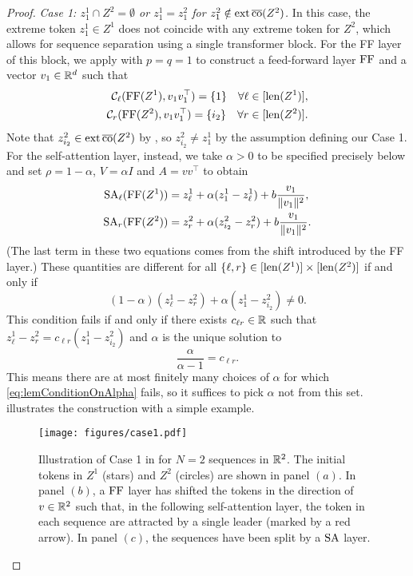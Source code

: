 \documentclass[11pt,a4paper]{amsart}
\begin{document}
\begin{proof}
\textit{Case 1: $z_1^1 \cap Z^2 = \emptyset$ or $z_1^1 = z_1^2$ for $z_1^2 \notin \operatorname{ext}\operatorname{\overline{co}} (Z^2)$.} In this case, the extreme token $z_1^1 \in Z^1$ does not coincide with any extreme token for $Z^2$, which allows for sequence separation using a single transformer block. For the FF layer of this block, we apply  with $p = q = 1$ to construct a feed-forward layer $\operatorname{\mathrm{FF}}$ and a vector $v_1\in \mathbb{R}^d$ such that
\begin{subequations}
    \begin{align}
    \mathcal{C}_{\ell} (\operatorname{\mathrm{FF}} (Z^1), v_1 v_1^\top) = \{ 1 \} \quad \forall \ell \in [\operatorname{len} (Z^1)],
    \\ 
    \mathcal{C}_r (\operatorname{\mathrm{FF}} (Z^2), v_1 v_1^\top) = \{ i_2 \} \quad \forall r \in [\operatorname{len} (Z^2)].
\end{align}
\end{subequations}
Note that $z_{i_2}^2\in \operatorname{ext} \operatorname{\overline{co}} (Z^2)$ by  , so $z_{i_2}^2\neq z_1^1$ by the assumption defining our Case 1. For the self-attention layer, instead, we take $\alpha > 0$ to be specified precisely below and set $\rho = 1 -\alpha$, $V = \alpha I$ and $A=vv^\top$ to obtain
\begin{subequations}
    \begin{align}
    \operatorname{\mathrm{SA}}_{\ell}(\operatorname{\mathrm{FF}} (Z^1)) &=  {z}_{\ell}^1 + \alpha ({z}_1^1 -{z}_{\ell}^1)  + b\frac{v_1}{\| v_1 \|^2}, \\ 
    \operatorname{\mathrm{SA}}_{r}(\operatorname{\mathrm{FF}} (Z^2)) &= {z}_r^2 + \alpha ({z}_{i_2}^2 - {z}_r^2) + b\frac{v_1}{\| v_1 \|^2}.    
\end{align}
\end{subequations}
(The last term in these two equations comes from the shift introduced by the FF layer.) These quantities are different for all $\{\ell, r\} \in [\operatorname{len} (Z^1)] \times [\operatorname{len} (Z^2)]$ if and only if
\begin{equation}\label{eq:lemConditionOnAlpha}
(1 - \alpha) (z_\ell^1 - z_r^2) + \alpha (z_1^1 - z_{i_2}^2) \neq 0.
\end{equation}
This condition fails if and only if there exists $c_{\ell r} \in \mathbb{R}$ such that $z_\ell^1 - z_r^2 = c_{\ell r} (z_1^1 - z_{i_2}^2)$ 
and $\alpha$ is the unique solution to
\begin{equation}
    \frac{\alpha}{\alpha - 1} = c_{\ell r}.
\end{equation}
This means there are at most finitely many choices of $\alpha$ for which \eqref{eq:lemConditionOnAlpha} fails, so it suffices to pick $\alpha$ not from this set.  illustrates the construction with a simple example.
\begin{figure}
    \centering
    \texttt{[image: figures/case1.pdf]}
    \caption{Illustration of Case 1 in  for $N=2$ sequences in $\mathbb{R}^2$. The initial tokens in $Z^1$ (stars) and $Z^2$ (circles) are shown in panel $(a)$. In panel $(b)$, a $\operatorname{\mathrm{FF}}$ layer has shifted the tokens in the direction of $v\in \mathbb{R}^2$ such that, in the following self-attention layer, the token in each sequence are attracted by a single leader (marked by a red arrow). In panel $(c)$, the sequences have been split by a $\operatorname{\mathrm{SA}}$ layer.}
    \label{fig:case1}
\end{figure}


\end{proof}
\end{document}
